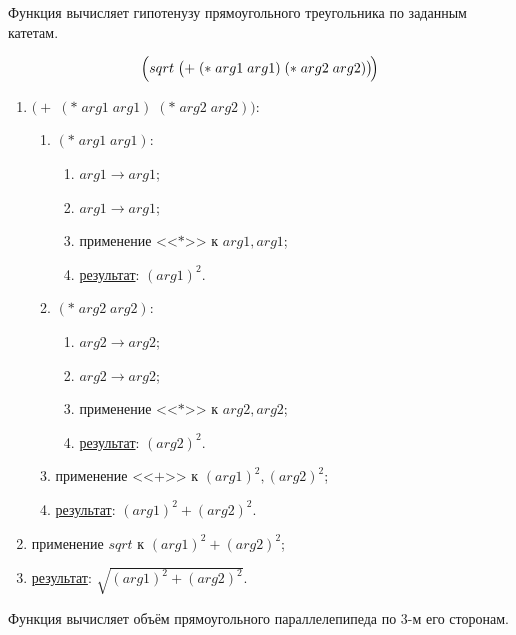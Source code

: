 \problem Функция вычисляет гипотенузу прямоугольного треугольника по заданным катетам.
\vfill

\vfill

\[
	\Bigl(sqrt\; \bigl(+\; (*\; arg1\; arg1)\; (*\; arg2\; arg2)\bigr)\!\Bigr)
\]
\vfill

\begin{enumerate}
	\item $\bigl(+\; (*\; arg1\; arg1)\; (*\; arg2\; arg2)\bigr)$:
	\begin{enumerate}
		\item $(*\; arg1\; arg1)$:
		\begin{enumerate}
			\item $arg1 \to arg1$;
			\item $arg1 \to arg1$;
			\item применение <<$*$>> к $arg1, arg1$;
			\item \underline{результат}: $(arg1)^2$.
		\end{enumerate}
		\item $(*\; arg2\; arg2)$:
		\begin{enumerate}
			\item $arg2 \to arg2$;
			\item $arg2 \to arg2$;
			\item применение <<$*$>> к $arg2, arg2$;
			\item \underline{результат}: $(arg2)^2$.
		\end{enumerate}
		\item применение <<$+$>> к $(arg1)^2, (arg2)^2$;
		\item \underline{результат}: $(arg1)^2 + (arg2)^2$.
	\end{enumerate}
	\item применение $sqrt$ к $(arg1)^2 + (arg2)^2$;
	\item \underline{результат}: $\sqrt{(arg1)^2 + (arg2)^2}$.
\end{enumerate}


\newpage
\problem Функция вычисляет объём прямоугольного параллелепипеда по 3-м его сторонам.


